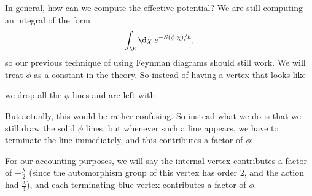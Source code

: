 \documentclass[a4paper]{article}
\begin{document}
In general, how can we compute the effective potential? We are still computing an integral of the form
\[
  \int_\R \d \chi\; e^{-S(\phi, \chi)/\hbar},
\]
so our previous technique of using Feynman diagrams should still work. We will treat $\phi$ as a constant in the theory. So instead of having a vertex that looks like
\begin{center}
\end{center}
we drop all the $\phi$ lines and are left with
\begin{center}
\end{center}
But actually, this would be rather confusing. So instead what we do is that we still draw the solid $\phi$ lines, but whenever such a line appears, we have to terminate the line immediately, and this contributes a factor of $\phi$:
\begin{center}
\end{center}
For our accounting purposes, we will say the internal vertex contributes a factor of $-\frac{\lambda}{2}$ (since the automorphism group of this vertex has order $2$, and the action had $\frac{\lambda}{4}$), and each terminating blue vertex contributes a factor of $\phi$.
\end{document}
